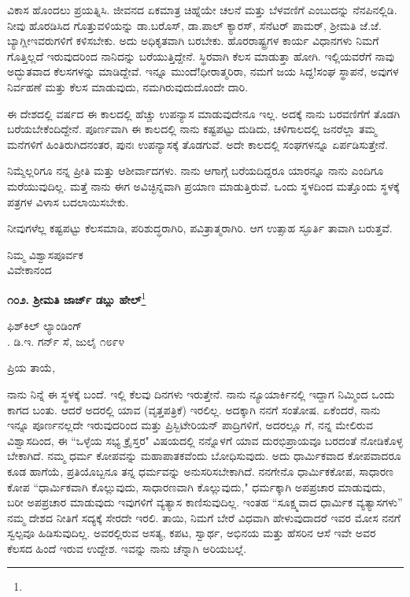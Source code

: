 ವಿಕಾಸ ಹೊಂದಲು ಪ್ರಯತ್ನಿಸಿ. ಜೀವನದ ಏಕಮಾತ್ರ ಚಿಹ್ನೆಯೇ ಚಲನೆ ಮತ್ತು ಬೆಳವಣಿಗೆ ಎಂಬುದನ್ನು ನೆನಪಿನಲ್ಲಿಡಿ. ನೀವು ಹೊರಡಿಸಿದ ಗೊತ್ತುವಳಿಯನ್ನು ಡಾ.ಬರೊಸ್, ಡಾ.ಪಾಲ್ ಕ್ಯಾರಸ್, ಸೆನೆಟರ್ ಪಾಮರ್, ಶ‍್ರೀಮತಿ ಜೆ.ಜೆ. ಬ್ಯಾಗ್ಲೀ\enginline{-}ಇವರುಗಳಿಗೆ ಕಳಿಸಬೇಕು. ಅದು ಅಧಿಕೃತವಾಗಿ ಬರಬೇಕು. ಹೊರರಾಷ್ಟ್ರಗಳ ಕಾರ್ಯ ವಿಧಾನಗಳು ನಿಮಗೆ ಗೊತ್ತಿಲ್ಲದೆ ಇರುವುದರಿಂದ ನಾನಿದನ್ನು ಬರೆಯುತ್ತಿದ್ದೇನೆ. ಸ್ಥಿರವಾಗಿ ಕೆಲಸ ಮಾಡುತ್ತಾ ಹೋಗಿ. ಇಲ್ಲಿಯವರೆಗೆ ನಾವು ಅದ್ಭುತವಾದ ಕೆಲಸಗಳನ್ನು ಮಾಡಿದ್ದೇವೆ. ಇನ್ನೂ ಮುಂದೆ!ಧೀರಾತ್ಮರಿರಾ, ನಮಗೆ ಜಯ ಸಿದ್ದ!ಸಂಘ ಸ್ಥಾಪನೆ, ಅವುಗಳ ನಿರ್ವಹಣೆ ಮತ್ತು ಕೆಲಸ ಮಾಡುವುದು, ನಮಗಿರುವುದುದೊಂದೇ ದಾರಿ.

ಈ ದೇಶದಲ್ಲಿ ವರ್ಷದ ಈ ಕಾಲದಲ್ಲಿ ಹೆಚ್ಚು ಉಪನ್ಯಾಸ ಮಾಡುವುದೇನೂ ಇಲ್ಲ. ಅದಕ್ಕೆ ನಾನು ಬರವಣಿಗೆಗೆ ತೊಡಗಿ ಬರೆಯಬೇಕೆಂದಿದ್ದೇನೆ. ಪೂರ್ಣವಾಗಿ ಈ ಕಾಲದಲ್ಲಿ ನಾನು ಕಷ್ಟಪಟ್ಟು ದುಡಿದು, ಚಳಿಗಾಲದಲ್ಲಿ ಜನರೆಲ್ಲಾ ತಮ್ಮ ಮನೆಗಳಿಗೆ ಹಿಂತಿರುಗಿದನಂತರ, ಪುನಃ ಉಪನ್ಯಾಸಕ್ಕೆ ತೊಡಗುವೆ. ಅದೇ ಕಾಲದಲ್ಲಿ ಸಂಘಗಳನ್ನೂ ಏರ್ಪಡಿಸುತ್ತೇನೆ.

ನಿಮ್ಮೆಲ್ಲರಿಗೂ ನನ್ನ ಪ್ರೀತಿ ಮತ್ತು ಆಶೀರ್ವಾದಗಳು. ನಾನು ಆಗಾಗ್ಗೆ ಬರೆಯದಿದ್ದರೂ ಯಾರನ್ನೂ ನಾನು ಎಂದಿಗೂ ಮರೆಯುವುದಿಲ್ಲ. ಮತ್ತೆ ನಾನು ಈಗ ಅವಿಚ್ಛಿನ್ನವಾಗಿ ಪ್ರಯಾಣ ಮಾಡುತ್ತಿರುವೆ. ಒಂದು ಸ್ಥಳದಿಂದ ಮತ್ತೊಂದು ಸ್ಥಳಕ್ಕೆ ಪತ್ರಗಳ ವಿಳಾಸ ಬದಲಾಯಿಸಬೇಕು.

ನೀವುಗಳೆಲ್ಲ ಕಷ್ಟಪಟ್ಟು ಕೆಲಸಮಾಡಿ, ಪರಿಶುದ್ಧರಾಗಿರಿ, ಪವಿತ್ರಾತ್ಮರಾಗಿರಿ. ಆಗ ಉತ್ಸಾಹ ಸ್ಫೂರ್ತಿ ತಾವಾಗಿ ಬರುತ್ತವೆ.

{\flushright
ನಿಮ್ಮ ವಿಶ್ವಾಸಪೂರ್ವಕ\\ವಿವೇಕಾನಂದ\par}

\begin{center}
\textbf{೧೦೨. ಶ‍್ರೀಮತಿ ಜಾರ್ಜ್ ಡಬ್ಲು ಹೇಲ್}\footnote{}
\end{center}

\begin{flushright}
ಫಿಶ್‌ಕಿಲ್ ಲ್ಯಾಂಡಿಂಗ್\\. ಡಿ.ಇ. ಗರ್ನ್ ಸೆ, ಜುಲೈ ೧೮೯೪
\end{flushright}

\noindent
ಪ್ರಿಯ ತಾಯೆ,

ನಾನು ನಿನ್ನೆ ಈ ಸ್ಥಳಕ್ಕೆ ಬಂದೆ. ಇಲ್ಲಿ ಕೆಲವು ದಿನಗಳು ಇರುತ್ತೇನೆ. ನಾನು ನ್ಯೂಯಾರ್ಕಿನಲ್ಲಿ ಇದ್ದಾಗ ನಿಮ್ಮಿಂದ ಒಂದು ಕಾಗದ ಬಂತು. ಆದರೆ ಅದರಲ್ಲಿ ಯಾವ  (ವೃತ್ತಪತ್ರಿಕೆ) ಇರಲಿಲ್ಲ. ಅದಕ್ಕಾಗಿ ನನಗೆ ಸಂತೋಷ. ಏಕೆಂದರೆ, ನಾನು ಇನ್ನೂ ಪೂರ್ಣನಲ್ಲದೇ ಇರುವುದರಿಂದ ಮತ್ತು ಪ್ರಿಸ್ಬಿಟೇರಿಯನ್ ಪಾದ್ರಿಗಳಿಗೆ, ಅದರಲ್ಲೂ  ಗೆ, ನನ್ನ ಮೇಲಿರುವ ವಿಶ್ವಾಸದಿಂದ, ಈ ``ಒಳ್ಳೆಯ ಸಭ್ಯ ಕ್ರೈಸ್ತರ" ವಿಷಯದಲ್ಲಿ ನನ್ನೊಳಗೆ ಯಾವ ದುರಭಿಪ್ರಾಯವೂ ಬರದಂತೆ ನೋಡಿಕೊಳ್ಳ ಬೇಕಾಗಿದೆ. ನಮ್ಮ ಧರ್ಮ ಕೋಪವನ್ನು ಮಹಾಪಾತಕವೆಂದು ಬೋಧಿಸುವುದು. ಅದು ಧಾರ್ಮಿಕವಾದ ಕೋಪವಾದರೂ ಕೂಡ ಹಾಗೆಯೆ, ಪ್ರತಿಯೊಬ್ಬನೂ ತನ್ನ ಧರ್ಮವನ್ನು ಅನುಸರಿಸಬೇಕಾಗಿದೆ. ನನಗೇನೊ ಧಾರ್ಮಿಕಕೋಪ, ಸಾಧಾರಣ ಕೋಪ ``ಧಾರ್ಮಿಕವಾಗಿ ಕೊಲ್ಲುವುದು, ಸಾಧಾರಣವಾಗಿ ಕೊಲ್ಲುವುದು,"  ಧರ್ಮಕ್ಕಾಗಿ ಅಪಪ್ರಚಾರ ಮಾಡುವುದು, ಬರೀ ಅಪಪ್ರಚಾರ ಮಾಡುವುದು ಇವುಗಳಿಗೆ ವ್ಯತ್ಯಾಸ ಕಾಣಿಸುವುದಿಲ್ಲ. ಇಂತಹ “ಸೂಕ್ಷ್ಮವಾದ ಧಾರ್ಮಿಕ ವ್ಯತ್ಯಾಸಗಳು” ನಮ್ಮ ದೇಶದ ನೀತಿಗೆ ಸದ್ಯಕ್ಕೆ ಸೇರದೇ ಇರಲಿ. ತಾಯಿ, ನಿಮಗೆ ಬೇರೆ ವಿಧವಾಗಿ ಹೇಳುವುದಾದರೆ ಇವರ ಮೋಸ ನನಗೆ ಸ್ವಲ್ಪವೂ ಹಿಡಿಸುವುದಿಲ್ಲ. ಅವರಲ್ಲಿರುವ ಅಸತ್ಯ, ಕಪಟ, ಸ್ವಾರ್ಥ, ಅಭಿನಯ ಮತ್ತು ಹೆಸರಿನ ಆಸೆ ಇವೇ ಅವರ ಕೆಲಸದ ಹಿಂದೆ ಇರುವ ಉದ್ದೇಶ. ಇವನ್ನು ನಾನು ಚೆನ್ನಾಗಿ ಅರಿಯಬಲ್ಲೆ.

